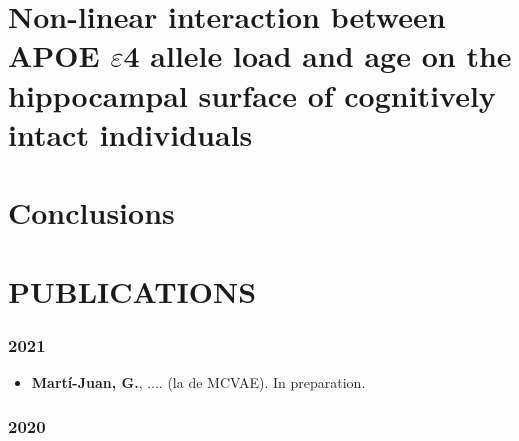 \documentclass[12pt, b5paper,twoside]{tesi_upf}
\begin{document}
\chapter{Non-linear interaction between APOE $\varepsilon$4 allele load and age on the hippocampal surface of cognitively intact individuals} \label{ch:5-pmhippocampus}


\chapter{Conclusions} \label{ch:6-conclusions}


\backmatter

% 





\chapter*{PUBLICATIONS}

\subsection*{2021}

\begin{itemize}
\item \textbf{Martí-Juan, G.}, .... (la de MCVAE). In preparation.
\end{itemize}

\subsection*{2020}
\end{document}

